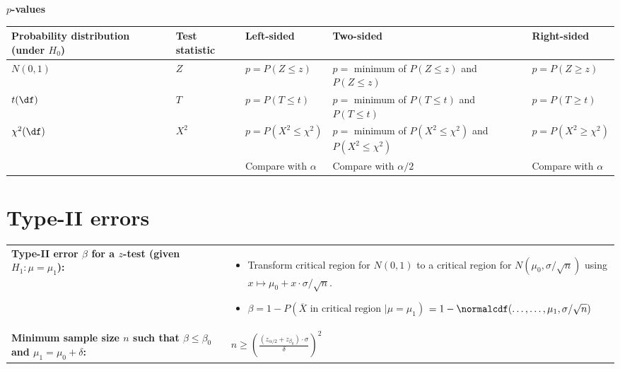 \documentclass[11pt,a4paper,english]{article} %
\begin{document}
\textbf{$p$-values}
\begin{center}
    \renewcommand{\arraystretch}{1.5}
    \begin{tabular}{m{}m{}m{}m{}m{}}
        \toprule
            \textbf{Probability distribution (under $H_0$)} & \textbf{Test \newline statistic} & \textbf{Left-sided} & \textbf{Two-sided} & \textbf{Right-sided} \\
        \midrule
            $N(0, 1)$ & $Z$ & $p = P(Z \leq z)$ & $p =$ minimum of \newline  $P(Z \leq z)$ and $P(Z \leq z)$ & $p = P(Z \geq z)$ \\
        \midrule
            $t(\df)$ & $T$ & $p = P(T \leq t)$ & $p =$ minimum of \newline $P(T \leq t)$ and $P(T \leq t)$ & $p = P(T \geq t)$\\
        \midrule
            $\chi^2(\df)$ & $X^2$ & $p = P(X^2 \leq \chi^2)$ & $p =$ minimum of \newline $P(X^2 \leq \chi^2)$ and $P(X^2 \leq \chi^2)$ & $p = P(X^2 \geq \chi^2)$\\
            & & Compare with $\alpha$ & Compare with $\alpha/2$ & Compare with $\alpha$ \\
        \bottomrule
    \end{tabular}
\end{center}

\section*{Type-II errors}
\begin{center}
    \begin{tabular}{m{}m{}}
        \textbf{Type-II error $\beta$ for a $z$-test (given $H_1: \mu = \mu_1$):} & \begin{itemize}\setlength\itemsep{1em}
        \item Transform critical region for $N(0,1)$ to a critical region for $N(\mu_0, \sigma / \sqrt{n})$ using $x \mapsto \mu_0 + x \cdot \sigma / \sqrt{n}$.
        \item $\beta = 1 - P(\overline{X} \text{ in critical region } | \mu = \mu_1)$ \newline $= 1 - \normalcdf(\ldots, \ldots, \mu_1, \sigma / \sqrt{n})$
    \end{itemize}\\
        \textbf{Minimum sample size $n$ such that $\beta \leq \beta_0$ and $\mu_1 = \mu_0 + \delta$:} & $n \geq \left( \frac{(z_{\alpha/2} + z_{\beta_0}) \cdot \sigma}{\delta}\right)^2$
    \end{tabular} 
\end{center}
\end{document}
